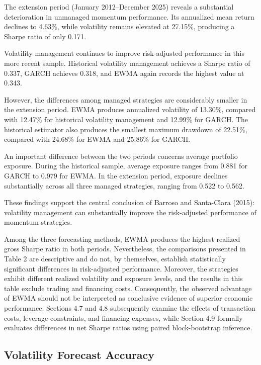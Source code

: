 \documentclass[11pt]{article}
\begin{document}
The extension period (January 2012--December 2025)
reveals a substantial deterioration in unmanaged
momentum performance. Its annualized mean return
declines to 4.63\%, while volatility remains elevated
at 27.15\%, producing a Sharpe ratio of only 0.171.

Volatility management continues to improve
risk-adjusted performance in this more recent sample.
Historical volatility management achieves a Sharpe
ratio of 0.337, GARCH achieves 0.318, and EWMA
again records the highest value at 0.343.

However, the differences among managed strategies
are considerably smaller in the extension period.
EWMA produces annualized volatility of 13.30\%,
compared with 12.47\% for historical volatility
management and 12.99\% for GARCH. The historical
estimator also produces the smallest maximum drawdown
of 22.51\%, compared with 24.68\% for EWMA and
25.86\% for GARCH.

An important difference between the two periods
concerns average portfolio exposure. During the
historical sample, average exposure ranges from
0.881 for GARCH to 0.979 for EWMA. In the
extension period, exposure declines substantially
across all three managed strategies, ranging from
0.522 to 0.562.

These findings support the central conclusion of
Barroso and Santa-Clara (2015): volatility management
can substantially improve the risk-adjusted
performance of momentum strategies.

Among the three forecasting methods, EWMA produces the highest realized gross Sharpe ratio in both periods. Nevertheless, the comparisons presented in Table 2 are descriptive and do not, by themselves, establish statistically significant differences in risk-adjusted performance. Moreover, the strategies exhibit different realized volatility and exposure levels, and the results in this table exclude trading and financing costs. Consequently, the observed advantage of EWMA should not be interpreted as conclusive evidence of superior economic performance. Sections 4.7 and 4.8 subsequently examine the effects of transaction costs, leverage constraints, and financing expenses, while Section 4.9 formally evaluates differences in net Sharpe ratios using paired block-bootstrap inference.


\subsection{Volatility Forecast Accuracy}
\end{document}
